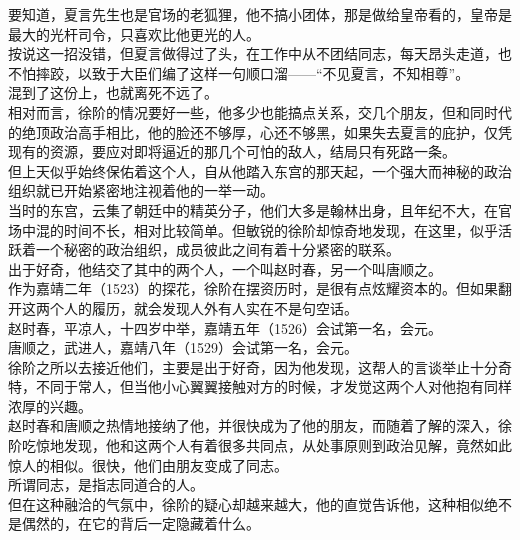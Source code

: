 \begin{multicols}{\theparacolNo}
要知道，夏言先生也是官场的老狐狸，他不搞小团体，那是做给皇帝看的，皇帝是最大的光杆司令，只喜欢比他更光的人。\\

按说这一招没错，但夏言做得过了头，在工作中从不团结同志，每天昂头走道，也不怕摔跤，以致于大臣们编了这样一句顺口溜——“不见夏言，不知相尊”。\\

混到了这份上，也就离死不远了。\\

相对而言，徐阶的情况要好一些，他多少也能搞点关系，交几个朋友，但和同时代的绝顶政治高手相比，他的脸还不够厚，心还不够黑，如果失去夏言的庇护，仅凭现有的资源，要应对即将逼近的那几个可怕的敌人，结局只有死路一条。\\

但上天似乎始终保佑着这个人，自从他踏入东宫的那天起，一个强大而神秘的政治组织就已开始紧密地注视着他的一举一动。\\

当时的东宫，云集了朝廷中的精英分子，他们大多是翰林出身，且年纪不大，在官场中混的时间不长，相对比较简单。但敏锐的徐阶却惊奇地发现，在这里，似乎活跃着一个秘密的政治组织，成员彼此之间有着十分紧密的联系。\\

出于好奇，他结交了其中的两个人，一个叫赵时春，另一个叫唐顺之。\\

作为嘉靖二年（1523）的探花，徐阶在摆资历时，是很有点炫耀资本的。但如果翻开这两个人的履历，就会发现人外有人实在不是句空话。\\

赵时春，平凉人，十四岁中举，嘉靖五年（1526）会试第一名，会元。\\

唐顺之，武进人，嘉靖八年（1529）会试第一名，会元。\\

徐阶之所以去接近他们，主要是出于好奇，因为他发现，这帮人的言谈举止十分奇特，不同于常人，但当他小心翼翼接触对方的时候，才发觉这两个人对他抱有同样浓厚的兴趣。\\

赵时春和唐顺之热情地接纳了他，并很快成为了他的朋友，而随着了解的深入，徐阶吃惊地发现，他和这两个人有着很多共同点，从处事原则到政治见解，竟然如此惊人的相似。很快，他们由朋友变成了同志。\\

所谓同志，是指志同道合的人。\\

但在这种融洽的气氛中，徐阶的疑心却越来越大，他的直觉告诉他，这种相似绝不是偶然的，在它的背后一定隐藏着什么。\\


\end{multicols}
